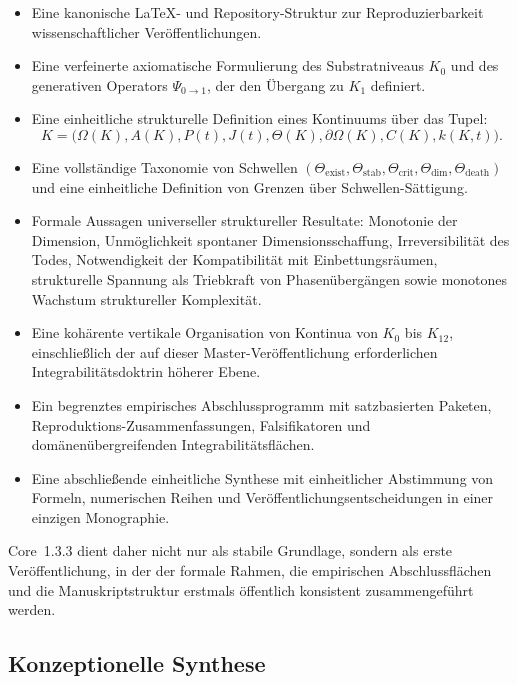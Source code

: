 \begin{itemize}
    \item Eine kanonische \LaTeX{}- und Repository-Struktur zur Reproduzierbarkeit
          wissenschaftlicher Veröffentlichungen.
    \item Eine verfeinerte axiomatische Formulierung des Substratniveaus
          \(K_0\) und des generativen Operators
          \(\Psi_{0\to 1}\), der den Übergang zu \(K_1\) definiert.
    \item Eine einheitliche strukturelle Definition eines Kontinuums über das
          Tupel:
          \[
              K = \big(\Omega(K), A(K), P(t), J(t), \Theta(K), \partial\Omega(K), C(K), k(K,t)\big).
          \]
    \item Eine vollständige Taxonomie von Schwellen
          \((\Theta_{\mathrm{exist}}, \Theta_{\mathrm{stab}}, \Theta_{\mathrm{crit}},
            \Theta_{\mathrm{dim}}, \Theta_{\mathrm{death}})\)
          und eine einheitliche Definition von Grenzen über Schwellen-Sättigung.
    \item Formale Aussagen universeller struktureller Resultate:
          Monotonie der Dimension,
          Unmöglichkeit spontaner Dimensionsschaffung,
          Irreversibilität des Todes,
          Notwendigkeit der Kompatibilität mit Einbettungsräumen,
          strukturelle Spannung als Triebkraft von Phasenübergängen
          sowie monotones Wachstum struktureller Komplexität.
    \item Eine kohärente vertikale Organisation von Kontinua von \(K_0\) bis
          \(K_{12}\), einschließlich der auf dieser Master-Veröffentlichung
          erforderlichen Integrabilitätsdoktrin höherer Ebene.
    \item Ein begrenztes empirisches Abschlussprogramm mit satzbasierten
          Paketen, Reproduktions-Zusammenfassungen, Falsifikatoren und
          domänenübergreifenden Integrabilitätsflächen.
    \item Eine abschließende einheitliche Synthese mit einheitlicher Abstimmung von
          Formeln, numerischen Reihen und Veröffentlichungsentscheidungen in einer
          einzigen Monographie.
\end{itemize}

Core~1.3.3 dient daher nicht nur als stabile Grundlage, sondern als erste
Veröffentlichung, in der der formale Rahmen, die empirischen Abschlussflächen und
die Manuskriptstruktur erstmals öffentlich konsistent zusammengeführt werden.

\subsection{Konzeptionelle Synthese}

